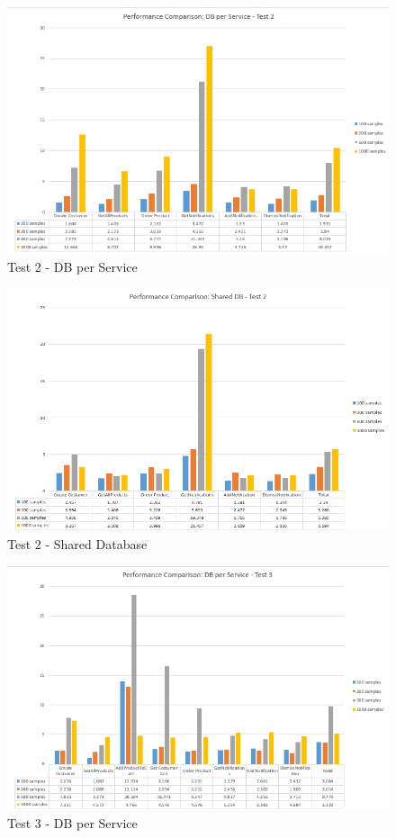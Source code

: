 \documentclass{article}
\begin{document}
\begin{figure}[h!]
\centering
\includegraphics[scale=0.70]{Test_Results/test_2_DB_per_Service.PNG}
\caption{Test 2 - DB per Service}
\label{fig:test_2_DB_per_Service}
\end{figure}

\pagebreak

\begin{figure}[h!]
\centering
\includegraphics[scale=0.60]{Test_Results/test_2_shared_DB.PNG}
\caption{Test 2 - Shared Database}
\label{fig:test_2_shared_DB}
\end{figure}

\begin{figure}[h!]
\centering
\includegraphics[scale=0.65]{Test_Results/test_3_DB_per_Service.PNG}
\caption{Test 3 - DB per Service}
\label{fig:test_3_DB_per_Service}
\end{figure}
\end{document}
